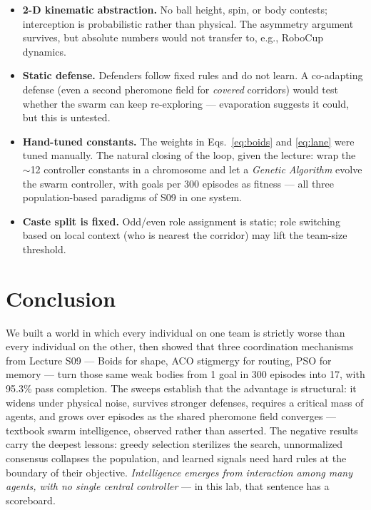 \documentclass[11pt,a4paper]{article}
\begin{document}
\begin{itemize}[itemsep=2pt]
  \item \textbf{2-D kinematic abstraction.} No ball height, spin, or body contests; interception
        is probabilistic rather than physical. The asymmetry argument survives, but absolute
        numbers would not transfer to, e.g., RoboCup dynamics.
  \item \textbf{Static defense.} Defenders follow fixed rules and do not learn. A co-adapting
        defense (even a second pheromone field for \emph{covered} corridors) would test whether
        the swarm can keep re-exploring --- evaporation suggests it could, but this is untested.
  \item \textbf{Hand-tuned constants.} The weights in Eqs.~\eqref{eq:boids} and \eqref{eq:lane}
        were tuned manually. The natural closing of the loop, given the lecture: wrap the
        $\sim$12 controller constants in a chromosome and let a \emph{Genetic Algorithm} evolve
        the swarm controller, with goals per 300 episodes as fitness --- all three
        population-based paradigms of S09 in one system.
  \item \textbf{Caste split is fixed.} Odd/even role assignment is static; role switching based
        on local context (who is nearest the corridor) may lift the team-size threshold.
\end{itemize}

\section{Conclusion}

We built a world in which every individual on one team is strictly worse than every individual
on the other, then showed that three coordination mechanisms from Lecture S09 --- Boids for
shape, ACO stigmergy for routing, PSO for memory --- turn those same weak bodies from 1 goal in
300 episodes into 17, with 95.3\% pass completion. The sweeps establish that the advantage is
structural: it widens under physical noise, survives stronger defenses, requires a critical mass
of agents, and grows over episodes as the shared pheromone field converges --- textbook swarm
intelligence, observed rather than asserted. The negative results carry the deepest lessons:
greedy selection sterilizes the search, unnormalized consensus collapses the population, and
learned signals need hard rules at the boundary of their objective. \emph{Intelligence emerges
from interaction among many agents, with no single central controller} --- in this lab, that
sentence has a scoreboard.
\end{document}
